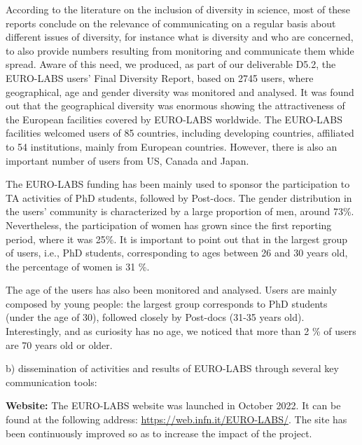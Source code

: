 According to the literature on the inclusion of diversity in science, most of these reports conclude on the relevance of communicating on a regular basis about different issues of diversity, for instance what is diversity and who are concerned,   to also provide numbers resulting from monitoring and communicate them whide spread. Aware of this need, we produced, as part of our deliverable D5.2, 
the EURO-LABS users' Final Diversity Report, based on 2745 users, where geographical, age and gender diversity was monitored and analysed. 
It was found out that the geographical diversity was enormous showing the attractiveness of the European facilities covered by EURO-LABS worldwide. The EURO-LABS facilities welcomed users of 85 countries, including developing countries, affiliated to 54 institutions, mainly from European countries. 
However, there is also an important number of users from US, Canada and Japan.

The EURO-LABS funding has been mainly used to sponsor the participation to TA activities of PhD students, followed by Post-docs. 
The gender distribution in the users’ community is characterized by a large proportion of men, around 73\%.  Nevertheless, the participation of women has grown since the first reporting period, where it was 25\%. It is important to point out that in the largest group of users, i.e., PhD students, corresponding to ages between 26 and 30 years old, the percentage of women is 31 \%.

The age of the users has also been monitored and analysed. Users are mainly composed by young people: the largest group corresponds to PhD students (under the age of 30), followed closely by Post-docs (31-35 years old). Interestingly, and as curiosity has no age, we noticed that more than 2 \% of users are 70 years old or older.


b) dissemination of activities and results of EURO-LABS through several key communication tools:

\textbf{Website:}
The EURO-LABS website was launched in October 2022. It can be found at the following address: \url{https://web.infn.it/EURO-LABS/}. 
The site has been continuously improved so as to increase the impact of the project.

